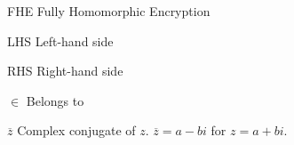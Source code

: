 \begin{siglas}
    \item[FHE] Fully Homomorphic Encryption
    \item[LHS] Left-hand side
    \item[RHS] Right-hand side  
  \end{siglas}
  
  \begin{simbolos}
    \item[$\in$] Belongs to 
    \item[$\overline{z}$] Complex conjugate of $z$. $\overline{z}=a-bi$ for $z=a+bi$.
  \end{simbolos}
